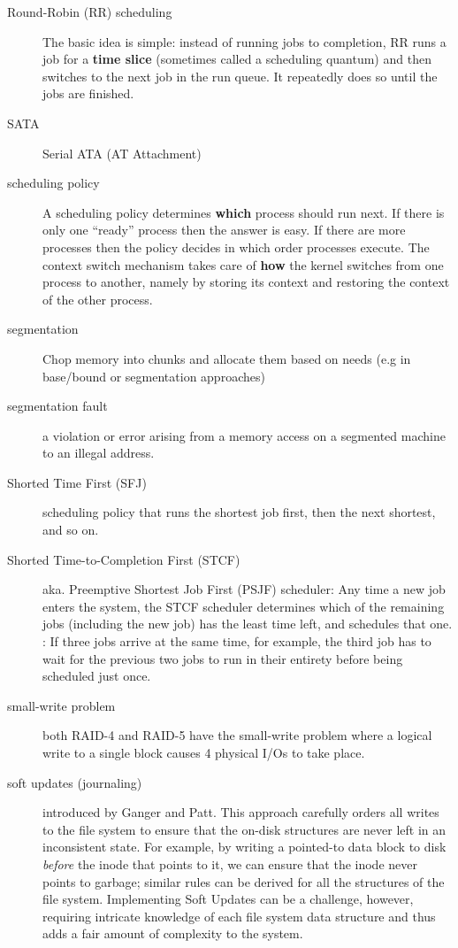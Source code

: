 \begin{description}
\item[Round-Robin (RR) scheduling] The basic idea is simple: instead of running jobs to completion, RR runs a job for a \textbf{time slice} (sometimes called a scheduling quantum) and then switches to the next job in the run queue. It repeatedly does so until the jobs are finished. 

\item[SATA] Serial ATA (AT Attachment)

\item[scheduling policy] A scheduling policy determines \textbf{which} process should run next. If there is only one “ready” process then the answer is easy. If there are more processes then the policy decides in which order processes
execute. The context switch mechanism takes care of \textbf{how} the kernel switches from one process to another, namely by storing its context and restoring the context of the other process.

\item[segmentation] Chop memory into  chunks and allocate them based on needs (e.g in base/bound or segmentation approaches)

\item[segmentation fault] a violation or error arising from a memory access on a segmented machine to an illegal address.

\item[Shorted Time First (SFJ)]  scheduling policy that runs the shortest job first, then the next shortest, and so on.

\item[Shorted Time-to-Completion First (STCF)] aka. Preemptive Shortest Job First (PSJF) scheduler: Any time a new job enters the system, the STCF scheduler determines which of the remaining jobs (including the new job) has the least time left, and schedules that one. : If three jobs arrive at the same time, for example, the third job has to wait for the previous two jobs to run in their entirety before being scheduled just once.

\item[small-write problem] both RAID-4 and RAID-5 have the small-write problem where a logical write to a single block causes 4 physical I/Os to take place.

\item[soft updates (journaling)] introduced by Ganger and Patt. This approach carefully orders all writes to the file system to ensure that the on-disk structures are never left in an inconsistent state. For example, by writing a pointed-to data block to disk \emph{before} the inode that points to it, we can ensure that the inode never points to garbage; similar rules can be derived for all the structures of the file system. Implementing Soft Updates can be a challenge, however, requiring
intricate knowledge of each file system data structure and thus adds a fair amount of complexity to the system.


\end{description}
